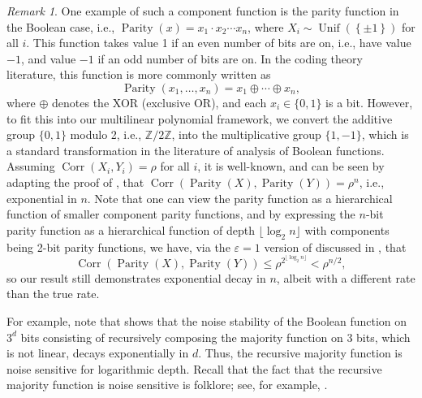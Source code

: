 \documentclass[12pt,letterpaper]{amsart}
\def\Z{\mathbb{Z}}
\def\Corr{\operatorname{Corr}}
\newcommand{\floor}[1]{\lfloor#1\rfloor}
\newcommand{\set}[1]{\left\{#1\right\}}
\newcommand{\1}[1]{1_{\left\{#1\right\}}}
\theoremstyle{definition}
\theoremstyle{remark}
\newtheorem{remark}[theorem]{Remark}
\begin{document}
\begin{remark}\label{remark:multilinear_parity}
    One example of such a component function is the parity function in the Boolean case, i.e., $\operatorname{Parity}(x)=x_1\cdot x_2\cdots x_n$, where $X_i\sim\operatorname{Unif}(\set{\pm1})$ for all $i$.
    This function takes value 1 if an even number of bits are on, i.e., have value $-1$, and value $-1$ if an odd number of bits are on.
    In the coding theory literature, this function is more commonly written as
    \[ \operatorname{Parity}(x_1,\dots,x_n)=x_1\oplus\cdots\oplus x_n, \]
    where $\oplus$ denotes the XOR (exclusive OR), and each $x_i\in\{0,1\}$ is a bit.
    However, to fit this into our multilinear polynomial framework, we convert the additive group $\{0,1\}$ modulo 2, i.e., $\Z/2\Z$, into the multiplicative group $\{1,-1\}$, which is a standard transformation in the literature of analysis of Boolean functions.
    Assuming $\Corr(X_i,Y_i)=\rho$ for all $i$, it is well-known, and can be seen by adapting the proof of , that $\Corr(\operatorname{Parity}(X),\operatorname{Parity}(Y))=\rho^n$, i.e., exponential in $n$.
    Note that one can view the parity function as a hierarchical function of smaller component parity functions, and by expressing the $n$-bit parity function as a hierarchical function of depth $\floor{\log_2n}$ with components being 2-bit parity functions, we have, via the $\varepsilon=1$ version of  discussed in , that 
    \[ \Corr(\operatorname{Parity}(X),\operatorname{Parity}(Y)) \leq \rho^{2^{\floor{\log_2n}}} < \rho^{n/2}, \]
    so our result still demonstrates exponential decay in $n$, albeit with a different rate than the true rate.
\end{remark}
For example, note that  shows that the noise stability of the Boolean function on $3^d$ bits consisting of recursively composing the majority function on 3 bits, which is not linear, decays exponentially in $d$.
Thus, the recursive majority function is noise sensitive for logarithmic depth. 
Recall that the fact that the recursive majority function is noise sensitive is folklore; see, for example, \cite{BenorLinial:90,BeKaSc:99}.
\end{document}
